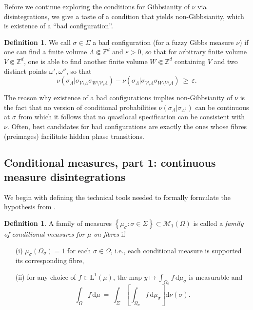 \documentclass[12pt]{article}
\renewcommand{\d}{\mathrm{d}}
\newcommand{\M}{\mathcal{M}}
\newcommand{\Z}{\mathbb{Z}}
\newcommand{\set}[1]{\left\{#1\right\}}
\newcommand{\oglati}[1]{\left[#1\right]}
\newcommand{\1}{\mathbbm{1}}
\renewcommand{\c}{\mathsf{c}}
\newcommand{\5}{\vspace{0.5cm}}
\theoremstyle{definition}
\newtheorem{df}[thm]{Definition}
\begin{document}
Before we continue exploring the conditions for Gibbsianity of $\nu$ via disintegrations, we give a taste of a condition that yields non-Gibbsianity, which is existence of a ``bad configuration''.

\begin{df}
We call $\sigma\in\Sigma$ a bad configuration (for a fuzzy Gibbs measure $\nu$) if one can find a finite volume $\Lambda\Subset\Z^d$ and $\varepsilon>0$, so that for arbitrary finite volume $V\Subset\Z^d$, one is able to find another finite volume $W\Subset\Z^d$ containing $V$ and two distinct points $\omega',\omega''$, so that
$$\nu(\sigma_\Lambda|\sigma_{V\setminus\Lambda}\sigma_{W\setminus V\setminus\Lambda})-\nu(\sigma_\Lambda|\sigma_{V\setminus\Lambda}\sigma_{W\setminus V\setminus\Lambda}) ~\geq~ \varepsilon.$$
\end{df}
The reason why existence of a bad configurations implies non-Gibbsianity of $\nu$ is the fact that no version of conditional probabilities $\nu(\sigma_\Lambda|\sigma_{\Lambda^\c})$ can be continuous at $\sigma$ from which it follows that no quasilocal specification can be consistent with $\nu$. Often, best candidates for bad configurations are exactly the ones whose fibres (preimages) facilitate hidden phase transitions.


\subsection{Conditional measures, part 1: continuous measure disintegrations}\label{sec:2.2}

We begin with defining the technical tools needed to formally formulate the hypothesis from \cite{EFS}.

\begin{df}\label{def:MeasureDisint}
A family of measures $\set{\mu_\sigma:\sigma\in\Sigma}\subset\M_1(\Omega)$ is called a \textit{family of conditional measures for $\mu$ on fibres} if
\begin{itemize}
	\item[(i)] $\mu_\sigma(\Omega_\sigma)=1$ for each $\sigma\in\Omega$, i.e., each conditional measure is supported its corresponding fibre,
	\item[(ii)] for any choice of $f\in\mathrm{L}^1(\mu)$, the map $y\mapsto\int_{\Omega_\sigma} f\,\d\mu_\sigma$ is measurable and
	$$\int_\Omega f\,\d\mu ~=~ \int_{\Sigma}\!\oglati{\int_{\Omega_\sigma} f\,\d\mu_\sigma}\!\d\nu(\sigma).$$
\end{itemize}
\end{df}
\end{document}

